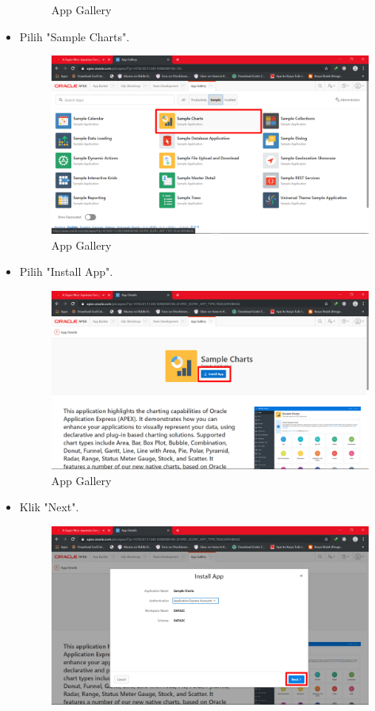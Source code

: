 \documentclass[12pt, times new roman]{article}
\begin{document}
\begin{itemize}
\begin{figure}[!htpb]
	\caption{App Gallery}
\end{figure}
\item Pilih "Sample Charts".
\begin{figure}[!htpb]
	\centering
	\includegraphics[width=12.5cm]{figures/Screenshot_26.png}
	\caption{App Gallery}
\end{figure}
\item Pilih "Install App".
\begin{figure}[!htpb]
	\centering
	\includegraphics[width=12.5cm]{figures/Screenshot_27.png}
	\caption{App Gallery}
\end{figure}
\item Klik "Next".
\begin{figure}[!htpb]
	\centering
	\includegraphics[width=12.5cm]{figures/Screenshot_28.png}

\end{figure}
\end{itemize}
\end{document}
